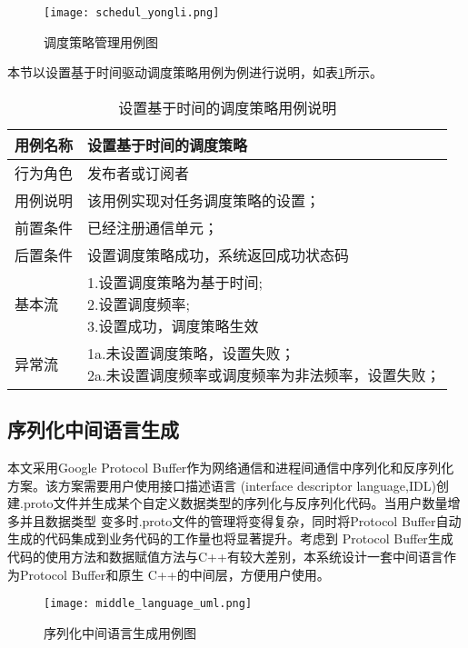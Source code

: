 \begin{figure}[H]
  \centering
  \texttt{[image: schedul\_yongli.png]}
  \caption{调度策略管理用例图}
  \label{schedul_yongli}
\end{figure}

本节以设置基于时间驱动调度策略用例为例进行说明，如表\ref{set_scheduler_yongli}所示。

\begin{table}[H]
  \centering\small
  \renewcommand\arraystretch{1.2}
  \caption{设置基于时间的调度策略用例说明}
  \label{set_scheduler_yongli}
  \begin{tabular}{ll}
    \toprule
    \multicolumn{1}{l}{用例名称} & \multicolumn{1}{l}{设置基于时间的调度策略}  \\
    \midrule
    行为角色 & 发布者或订阅者\\
    用例说明 & 该用例实现对任务调度策略的设置；\\
    前置条件 & 已经注册通信单元；\\
    后置条件 & 设置调度策略成功，系统返回成功状态码\\
    基本流   & \makecell[l]{1.设置调度策略为基于时间;\\2.设置调度频率;\\3.设置成功，调度策略生效}\\
    异常流   & \makecell[l]{1a.未设置调度策略，设置失败；\\2a.未设置调度频率或调度频率为非法频率，设置失败；}\\
    \bottomrule
  \end{tabular}
\end{table}

\subsection{序列化中间语言生成}
本文采用Google Protocol Buffer作为网络通信和进程间通信中序列化和反序列化方案。该方案需要用户使用接口描述语言
(interface descriptor language,IDL)创建.proto文件并生成某个自定义数据类型的序列化与反序列化代码。当用户数量增多并且数据类型
变多时.proto文件的管理将变得复杂，同时将Protocol Buffer自动生成的代码集成到业务代码的工作量也将显著提升。考虑到
Protocol Buffer生成代码的使用方法和数据赋值方法与C++有较大差别，本系统设计一套中间语言作为Protocol Buffer和原生
C++的中间层，方便用户使用。

\begin{figure}[H]
  \centering
  \texttt{[image: middle\_language\_uml.png]}
  \caption{序列化中间语言生成用例图}
  \label{middle_language_uml}
\end{figure}


